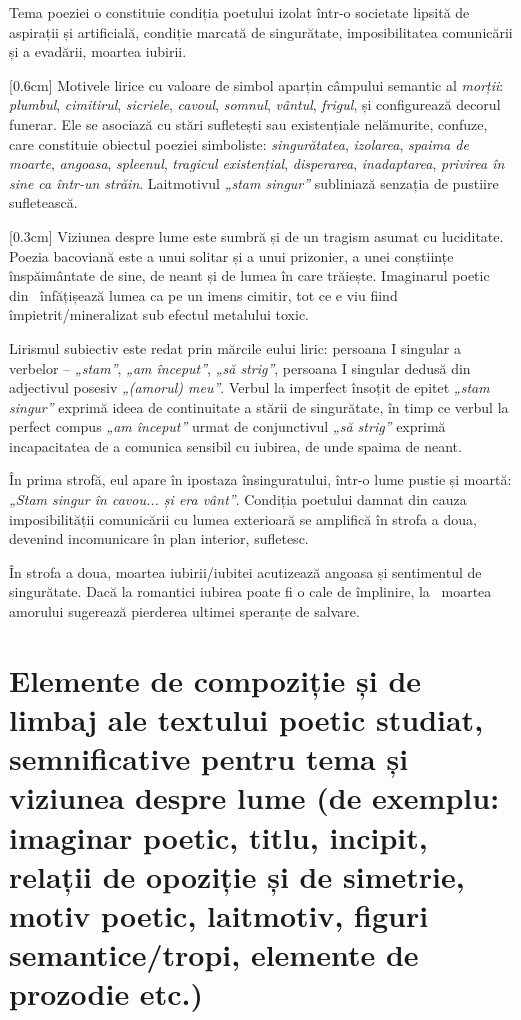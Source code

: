 Tema poeziei o constituie condiția poetului izolat într-o societate lipsită de aspirații și artificială, condiție marcată de singurătate, imposibilitatea comunicării și a evadării, moartea iubirii.

[0.6cm]
Motivele lirice cu valoare de simbol aparțin câmpului semantic al \textit{morții}: \textit{plumbul}, \textit{cimitirul}, \textit{sicriele}, \textit{cavoul}, \textit{somnul}, \textit{vântul}, \textit{frigul}, și configurează decorul funerar. Ele se asociază cu stări sufletești sau existențiale nelămurite, confuze, care constituie obiectul poeziei simboliste: \textit{singurătatea}, \textit{izolarea}, \textit{spaima de moarte}, \textit{angoasa}, \textit{spleenul}, \textit{tragicul existențial}, \textit{disperarea}, \textit{inadaptarea}, \textit{privirea în sine ca într-un străin}. Laitmotivul \textit{„stam singur”} subliniază senzația de pustiire sufletească.

[0.3cm]
Viziunea despre lume este sumbră și de un tragism asumat cu luciditate. Poezia bacoviană este a unui solitar și a unui prizonier, a unei conștiințe înspăimântate de sine, de neant și de lumea în care trăiește. Imaginarul poetic din \operatitle\ înfățișează lumea ca pe un imens cimitir, tot ce e viu fiind împietrit/mineralizat sub efectul metalului toxic.

Lirismul subiectiv este redat prin mărcile eului liric: persoana I singular a verbelor -- \textit{„stam”}, \textit{„am început”}, \textit{„să strig”}, persoana I singular dedusă din adjectivul posesiv \textit{„(amorul) meu”}. Verbul la imperfect însoțit de epitet \textit{„stam singur”} exprimă ideea de continuitate a stării de singurătate, în timp ce verbul la perfect compus \textit{„am început”} urmat de conjunctivul \textit{„să strig”} exprimă incapacitatea de a comunica sensibil cu iubirea, de unde spaima de neant.

În prima strofă, eul apare în ipostaza însinguratului, într-o lume pustie și moartă: \textit{„Stam singur în cavou... și era vânt”}. Condiția poetului damnat din cauza imposibilității comunicării cu lumea exterioară se amplifică în strofa a doua, devenind incomunicare în plan interior, sufletesc.

În strofa a doua, moartea iubirii/iubitei acutizează angoasa și sentimentul de singurătate. Dacă la romantici iubirea poate fi o cale de împlinire, la \operaauthor\ moartea amorului sugerează pierderea ultimei speranțe de salvare.


\section{Elemente de compoziție și de limbaj ale textului poetic studiat, semnificative pentru tema și viziunea despre lume {\footnotesize\normalfont(de exemplu: imaginar poetic, titlu, incipit, relații de opoziție și de simetrie, motiv poetic, laitmotiv, figuri semantice/tropi, elemente de prozodie etc.)}}

